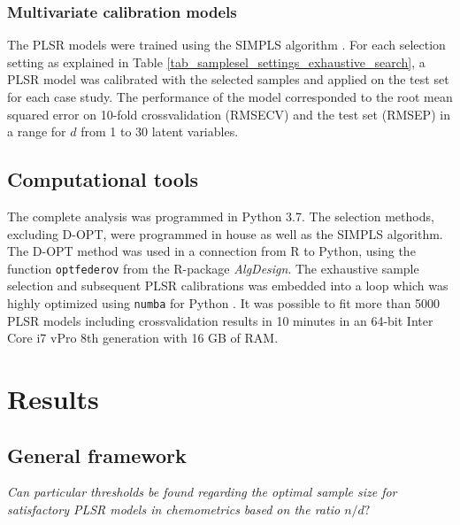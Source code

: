 \documentclass[journal=ancham,manuscript=article]{achemso}
\begin{document}
\subsubsection{Multivariate calibration models}

The PLSR models were trained using the SIMPLS algorithm \cite{DeJong1993}. For each selection setting as explained in Table \ref{tab_samplesel_settings_exhaustive_search}, a PLSR model was calibrated with the selected samples and applied on the test set for each case study. The performance of the model corresponded to the root mean squared error on 10-fold crossvalidation (RMSECV) and the test set (RMSEP) in a range for $d$ from 1 to 30 latent variables. 

\subsection{Computational tools}

The complete analysis was programmed in Python 3.7. The selection methods, excluding D-OPT, were programmed in house as well as the SIMPLS algorithm. The D-OPT method was used in a connection from R to Python, using the function \texttt{optfederov} from the R-package \emph{AlgDesign}\cite{Wheeler2019}. The exhaustive sample selection and subsequent PLSR calibrations was embedded into a loop which was highly optimized using \texttt{numba} for Python \cite{Lam2015}. It was possible to fit more than 5000 PLSR models including crossvalidation results in 10 minutes in an 64-bit Inter Core i7 vPro 8th generation with 16 GB of RAM. 



\section*{Results}\label{results}

\subsection*{General framework}\label{results:genframework}

\emph{Can particular thresholds be found regarding the optimal sample size for satisfactory PLSR models in chemometrics based on the ratio $n/d?$}
\end{document}
